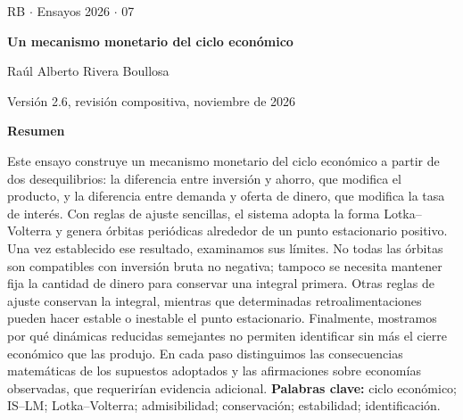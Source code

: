 \documentclass[10.5pt,twoside]{article}
\newcommand{\seriesmark}{RB $\cdot$ Ensayos 2026 $\cdot$ 07}
\newcommand{\booktitle}{Un mecanismo monetario del ciclo económico}
\newcommand{\authorname}{Raúl Alberto Rivera Boullosa}
\begin{document}
\fontsize{10.5}{13.1}\selectfont
\setlength{\abovedisplayskip}{7pt plus 2pt minus 2pt}
\setlength{\belowdisplayskip}{7pt plus 2pt minus 2pt}
\setlength{\abovedisplayshortskip}{4pt plus 2pt minus 1pt}
\setlength{\belowdisplayshortskip}{5pt plus 2pt minus 1pt}

\begin{titlepage}
\thispagestyle{empty}
\begin{center}
{\small \seriesmark}\par
\vspace*{30mm}
{\fontsize{23}{27}\selectfont\bfseries \booktitle\par}
\vfill
{\fontsize{14}{17}\selectfont \authorname\par}
\vspace{8mm}
{\fontsize{10.5}{12.5}\selectfont Versión 2.6, revisión compositiva, noviembre de 2026\par}
\vspace*{20mm}
\end{center}
\end{titlepage}

\thispagestyle{empty}
\begin{center}
\vspace*{8mm}
{\fontsize{14}{16}\selectfont\bfseries Resumen}
\end{center}
\vspace{10mm}

Este ensayo construye un mecanismo monetario del ciclo económico a partir de dos desequilibrios: la diferencia entre inversión y ahorro, que modifica el producto, y la diferencia entre demanda y oferta de dinero, que modifica la tasa de interés. Con reglas de ajuste sencillas, el sistema adopta la forma Lotka--Volterra y genera órbitas periódicas alrededor de un punto estacionario positivo. Una vez establecido ese resultado, examinamos sus límites. No todas las órbitas son compatibles con inversión bruta no negativa; tampoco se necesita mantener fija la cantidad de dinero para conservar una integral primera. Otras reglas de ajuste conservan la integral, mientras que determinadas retroalimentaciones pueden hacer estable o inestable el punto estacionario. Finalmente, mostramos por qué dinámicas reducidas semejantes no permiten identificar sin más el cierre económico que las produjo. En cada paso distinguimos las consecuencias matemáticas de los supuestos adoptados y las afirmaciones sobre economías observadas, que requerirían evidencia adicional.\vfill
\noindent\textbf{Palabras clave:} ciclo económico; IS--LM; Lotka--Volterra; admisibilidad; conservación; estabilidad; identificación.
\vspace*{16mm}
\clearpage
\end{document}

